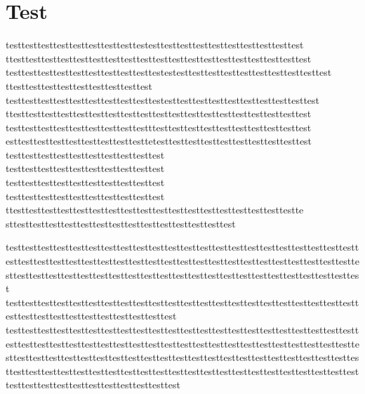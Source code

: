 \documentclass[
]{article}
\author{}
\date{}
\begin{document}
\hypertarget{test}{%
\section{Test}\label{test}}

testtesttesttesttesttesttesttesttestesttesttesttesttesttesttesttesttesttest\\
ttesttesttesttesttesttesttesttesttesttesttesttesttesttesttesttesttesttesttest\\
testtesttesttesttesttesttesttesttesttestestesttesttesttesttesttesttesttesttesttest\ttesttesttesttesttesttesttesttesttest\\
ttesttesttesttesttesttesttesttesttest
testtesttesttesttesttesttesttesttesttestesttesttesttesttesttesttesttesttesttest\\
ttesttesttesttesttesttesttesttesttesttesttesttesttesttesttesttesttesttesttest\\
testtesttesttesttesttesttesttesttestttesttesttesttesttesttesttesttesttesttest\\
esttesttesttesttesttesttesttesttesttetesttesttesttesttesttesttesttesttesttest\\
testtesttesttesttesttesttesttesttesttest\\

testtesttesttesttesttesttesttesttesttest\\
testtesttesttesttesttesttesttesttesttest\\

testtesttesttesttesttesttesttesttesttest\\
ttesttesttesttesttesttesttesttesttesttesttesttesttesttesttesttesttesttestte
sttesttesttesttesttesttesttesttesttesttesttesttesttesttest

testtesttesttesttesttesttesttesttesttesttesttesttesttesttesttesttesttesttesttesttesttesttesttesttesttesttesttesttesttesttesttesttesttesttesttesttesttesttesttesttesttesttesttesttesttesttesttesttesttesttesttesttesttesttesttesttesttesttesttesttesttesttesttesttesttesttest\\
testtesttesttesttesttesttesttesttesttesttesttesttesttesttesttesttesttesttesttesttesttesttesttesttesttesttesttesttesttesttesttesttest
testtesttesttesttesttesttesttesttesttesttesttesttesttesttesttesttesttesttesttesttesttesttesttesttesttesttesttesttesttesttesttesttesttesttesttesttesttesttesttesttesttesttesttesttesttesttesttesttesttesttesttesttesttesttesttesttesttesttesttesttesttesttesttesttesttesttesttesttesttesttesttesttesttesttesttesttesttesttesttesttesttesttesttesttesttesttesttesttesttesttesttesttesttesttesttesttesttesttesttest
\end{document}

